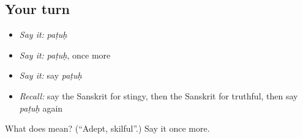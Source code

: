 \subsection*{Your turn}
\begin{itemize}
\raggedright
  \item \emph{Say it:} \emph{paṭuḥ}
  \item \emph{Say it:} \emph{paṭuḥ}, once more
  \item \emph{Say it:} say \emph{paṭuḥ}
  \item \emph{Recall:} say the Sanskrit for stingy, then the Sanskrit for truthful, then say \emph{paṭuḥ} again
\end{itemize}

\begin{tcolorbox}[breakable,colback=teal!4,colframe=teal!35!black,title={Before you move on}]
What does  mean? (\textquotedblleft{}Adept, skilful\textquotedblright{}.) Say it once more.
\end{tcolorbox}

